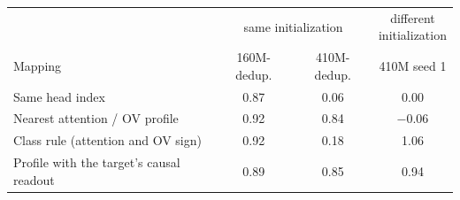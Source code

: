 \begin{tabular}{lccc}
\toprule
& \multicolumn{2}{c}{same initialization} & \makecell{different\\initialization} \\
\cmidrule(lr){2-3}\cmidrule(lr){4-4}
Mapping & 160M-dedup. & 410M-dedup. & 410M seed 1 \\
\midrule
Same head index & 0.87 & 0.06 & 0.00 \\
Nearest attention / OV profile & 0.92 & 0.84 & $-$0.06 \\
Class rule (attention and OV sign) & 0.92 & 0.18 & 1.06 \\
Profile with the target's causal readout & 0.89 & 0.85 & 0.94 \\
\bottomrule
\end{tabular}
